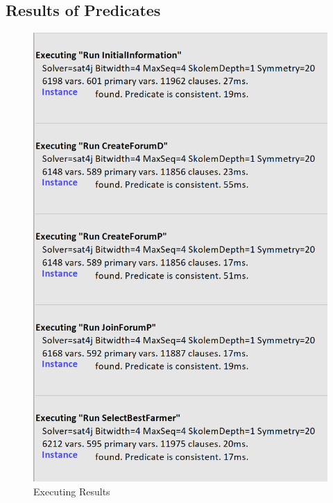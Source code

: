 \subsection{Results of Predicates}
\begin{figure}[H]
  \centering
  \includegraphics[width=0.6\textheight,keepaspectratio, angle=0]{figures/Executing.png}
  \caption{Executing Results}
\end{figure}
\clearpage
